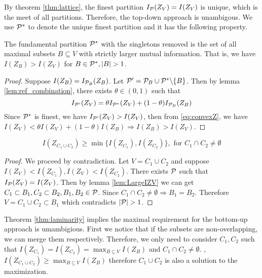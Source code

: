 \documentclass{article}
\begin{document}
By theorem \ref{thm:lattice}, the finest partition $I_{\P}(Z_V)=I(Z_V)$ is unique, which is the meet of all partitions. Therefore, the top-down approach is unambigous. We use $\P^*$ to denote the unique finest partition and it has the following property.
\begin{theorem}\label{thm:strict_larger_mi}
The fundamental partition $\P^*$ with the singletons removed is the set of all maximal subsets $B \subseteq V$ with strictly larger mutual information. 
That is, we have
$I(Z_B) > I(Z_V)$ for $B \in \P^*, \abs{B}>1$.
\end{theorem}
\begin{proof}
Suppose $I(Z_B)=I_{\P_B}(Z_B)$.
Let $\P' = \P_B \cup  \P^* \backslash \{B\}$.
Then by lemma \ref{lem:ref_combination}, there exists $\theta \in (0,1)$ such that 
\begin{equation}\label{eq:convexZ}
I_{\P'}(Z_V) = \theta I_{\P^*}(Z_V) + (1-\theta) I_{\P_B}(Z_B)
\end{equation}
Since $\P^*$ is finest, we have $I_{\P'}(Z_V) > I(Z_V)$, then from \eqref{eq:convexZ}, we have 
$I(Z_V) < \theta I(Z_V) + (1-\theta) I(Z_B) \Rightarrow I(Z_B) > I(Z_V)$.
\end{proof}
\begin{theorem}[Laminarity]\label{thm:laminarity}
\begin{equation}\label{eq:P}
I(Z_{C_1 \cup C_2}) \geq \min\{ I(Z_{C_1}), I(Z_{C_2})\}, \textrm{ for } C_1\cap C_2 \neq \emptyset
\end{equation}
\end{theorem}
\begin{proof}
	We proceed by contradiction. Let $V=C_1 \cup C_2$ and suppose $I(Z_V) < I(Z_{C_1}),
	I(Z_V) < I(Z_{C_2})$. There exists $\P$ such that $I_{\P}(Z_V) = I(Z_V)$.
	Then by lemma \ref{lem:LargeIZV} we can get $C_1 \subset B_1, C_2 \subset B_2, B_1, B_2 \in
	\P$. Since $C_1 \cap C_2 \neq \emptyset \Rightarrow B_1 = B_2$. Therefore $V=C_1 \cup C_2 \subset B_1$ which contradicts $\abs{\P}>1$.
\end{proof}
Theorem \ref{thm:laminarity} implies the maximal requirement for the bottom-up approach is umambigious. First we notice that if the subsets are non-overlapping, we can merge them respectively. Therefore, we only need to consider $C_1, C_2$ such that $I(Z_{C_1}) = I(Z_{C_2}) = \max_{B\subseteq V} I(Z_B)$ and $C_1\cap C_2 \neq \emptyset$. , $I(Z_{C_1\cup C_2}) \geq \max_{B\subseteq V} I(Z_B)$ therefore $C_1\cup C_2$ is also a solution to the maximization.
\end{document}
